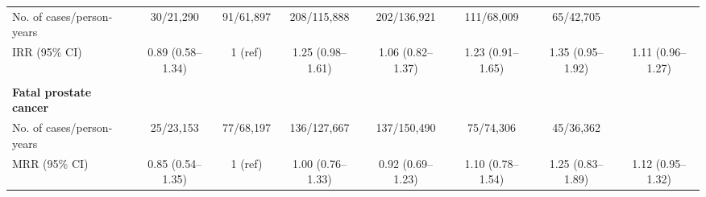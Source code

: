 \begin{table}
\begin{adjustbox}{max width=\textwidth}
\begin{tabular}{lccccccc}
No. of cases/person-years       & 30/21,290            & 91/61,897            & 208/115,888          & 202/136,921          & 111/68,009           & 65/42,705            &                                                                                   \\
IRR (95\% CI)                   & 0.89 (0.58--1.34)    & 1 (ref)              & 1.25 (0.98--1.61)    & 1.06 (0.82--1.37)    & 1.23 (0.91--1.65)    & 1.35 (0.95--1.92)    & 1.11 (0.96--1.27)                                                                 \\
                                &                      &                      &                      &                      &                      &                      &                                                                                   \\
{\bf Fatal prostate cancer}     &                      &                      &                      &                      &                      &                      &                                                                                   \\
No. of cases/person-years       & 25/23,153            & 77/68,197            & 136/127,667          & 137/150,490          & 75/74,306            & 45/36,362            &                                                                                   \\
MRR (95\% CI)                   & 0.85 (0.54--1.35)    & 1 (ref)              & 1.00 (0.76--1.33)    & 0.92 (0.69--1.23)    & 1.10 (0.78--1.54)    & 1.25 (0.83--1.89)    & 1.12 (0.95--1.32)                                                                 \\ \hline
\end{tabular}
\end{adjustbox}
\end{table}

